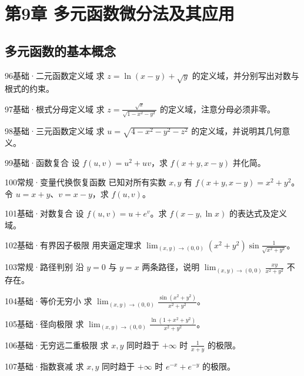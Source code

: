 \section{第9章 多元函数微分法及其应用}
\subsection{多元函数的基本概念}
\begin{exercise}{96}{基础·二元函数定义域}
求 $z=\ln(x-y)+\sqrt y$ 的定义域，并分别写出对数与根式的约束。
\end{exercise}
\begin{exercise}{97}{基础·根式分母定义域}
求 $z=\frac{\sqrt x}{\sqrt{1-x^2-y^2}}$ 的定义域，注意分母必须非零。
\end{exercise}
\begin{exercise}{98}{基础·三元函数定义域}
求 $u=\sqrt{4-x^2-y^2-z^2}$ 的定义域，并说明其几何意义。
\end{exercise}
\begin{exercise}{99}{基础·函数复合}
设 $f(u,v)=u^2+uv$，求 $f(x+y,x-y)$ 并化简。
\end{exercise}
\begin{exercise}{100}{常规·变量代换恢复函数}
已知对所有实数 $x,y$ 有 $f(x+y,x-y)=x^2+y^2$。令 $u=x+y$、$v=x-y$，求 $f(u,v)$。
\end{exercise}
\begin{exercise}{101}{基础·对数复合}
设 $f(u,v)=u+e^v$。求 $f(x-y,\ln x)$ 的表达式及定义域。
\end{exercise}
\begin{exercise}{102}{基础·有界因子极限}
用夹逼定理求 $\lim_{(x,y)\to(0,0)}(x^2+y^2)\sin\frac1{\sqrt{x^2+y^2}}$。
\end{exercise}
\begin{exercise}{103}{常规·路径判别}
沿 $y=0$ 与 $y=x$ 两条路径，说明 $\lim_{(x,y)\to(0,0)}\frac{xy}{x^2+y^2}$ 不存在。
\end{exercise}
\begin{exercise}{104}{基础·等价无穷小}
求 $\lim_{(x,y)\to(0,0)}\frac{\sin(x^2+y^2)}{x^2+y^2}$。
\end{exercise}
\begin{exercise}{105}{基础·径向极限}
求 $\lim_{(x,y)\to(0,0)}\frac{\ln(1+x^2+y^2)}{x^2+y^2}$。
\end{exercise}
\begin{exercise}{106}{基础·无穷远二重极限}
求 $x,y$ 同时趋于 $+\infty$ 时 $\frac1{x+y}$ 的极限。
\end{exercise}
\begin{exercise}{107}{基础·指数衰减}
求 $x,y$ 同时趋于 $+\infty$ 时 $e^{-x}+e^{-y}$ 的极限。
\end{exercise}
